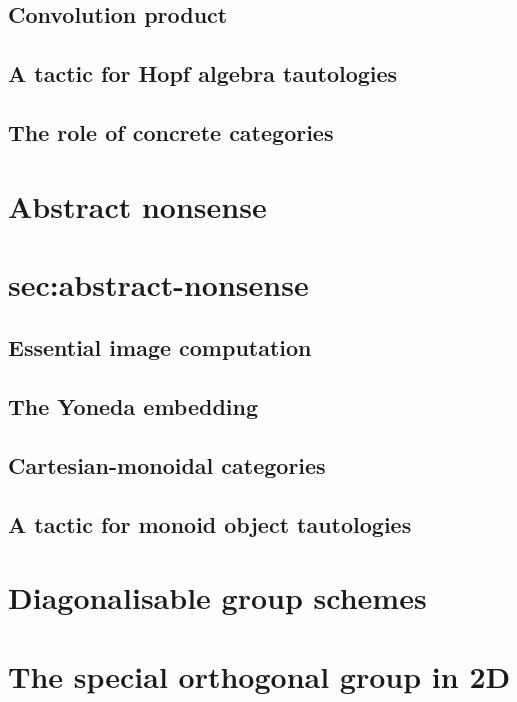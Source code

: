 \documentclass{article}
\begin{document}
\subsection{Convolution product}\label{sec:conv-prod}



\subsection{A tactic for Hopf algebra tautologies}



\subsection{The role of concrete categories}\label{sec:concrete-categories}



\section{Abstract nonsense}\section{sec:abstract-nonsense}


\subsection{Essential image computation}


\subsection{The Yoneda embedding}


\subsection{Cartesian-monoidal categories}


\subsection{A tactic for monoid object tautologies}


\section{Diagonalisable group schemes}


\section{The special orthogonal group in 2D}
\end{document}
